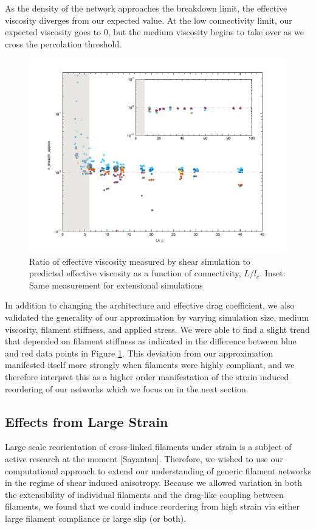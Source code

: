 \documentclass[pre,preprint]{revtex4-1}
\begin{document}
As the density of the network approaches the breakdown limit, the effective viscosity diverges from our expected value.  At the low connectivity limit, our expected viscosity goes to 0, but the medium viscosity begins to take over as we cross the percolation threshold.  
\begin{figure}[h!]
\centering
\includegraphics[width=\hsize]{eff_vic_master}
\caption{\label{fig:effvic}Ratio of effective viscosity measured by shear simulation to predicted effective viscosity as a function of connectivity, $L/l_c$. Inset: Same measurement for extensional simulations }
\end{figure}

In addition to changing the architecture and effective drag coefficient, we also validated the generality of our approximation by varying simulation size, medium viscosity, filament stiffness, and applied stress.  We were able to find a slight trend that depended on filament stiffness as indicated in the difference between blue and red data points in Figure \ref{fig:effvic}.  This deviation from our approximation manifested itself more strongly when filaments were highly compliant, and we therefore interpret this as a higher order manifestation of the strain induced reordering of our networks which we focus on in the next section.



\subsection{Effects from Large Strain}

Large scale reorientation of cross-linked filaments under strain is a subject of active research at the moment [Sayantan].  Therefore, we wished to use our computational approach to extend our understanding of generic filament networks in the regime of shear induced anisotropy.  Because we allowed variation in both the extensibility of individual filaments and the drag-like coupling between filaments, we found that we could induce reordering from high strain via either large filament compliance or large slip (or both).  
\end{document}
